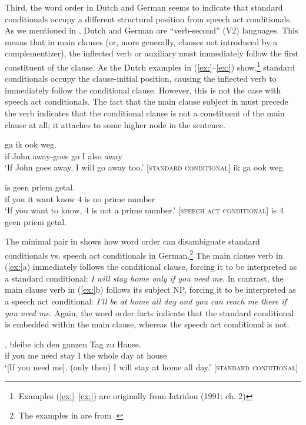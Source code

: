Third, the word order in Dutch and German seems to indicate that standard conditionals occupy a different structural position from speech act conditionals. As we mentioned in , Dutch and German are “verb-second” (V2) languages. This means that in main clauses (or, more generally, clauses not introduced by a complementizer), the inflected verb or auxiliary must immediately follow the first constituent of the clause. As the Dutch examples in (\ref{ex:}--\ref{ex:}) show,\footnote{Examples (\ref{ex:}--\ref{ex:}) are originally from Iatridou (1991: ch. 2)} standard conditionals occupy the clause-initial position, causing the inflected verb to immediately follow the conditional clause. However, this is not the case with speech act conditionals. The fact that the main clause subject in  must precede the verb indicates that the conditional clause is not a constituent of the main clause at all; it attaches to some higher node in the sentence.


\ea
\ea {}  ga  ik  ook  weg.\\
 if  John  away-goes  go  I  also  away\\
\glt ‘If John goes away, I will go away too.’    [\textsc{standard conditional}]
 ik ga ook weg.
\z \z

\ea
\ea {}  is  geen  priem  getal.\\
 if  you  it  want  know  4  is  no  prime  number\\
\glt ‘If you want to know, 4 is not a prime number.’  [\textsc{speech act} \textsc{conditional}]
 is 4 geen priem getal.
\z \z


The minimal pair in  shows how word order can disambiguate standard conditionals vs. speech act conditionals in German.\footnote{The examples in  are from \citet[102]{Scheffler2013}.} The main clause verb in (\ref{ex:}a) immediately follows the conditional clause, forcing it to be interpreted as a standard conditional: \textit{I will stay home only if you need me}. In contrast, the main clause verb in (\ref{ex:}b) follows its subject NP, forcing it to be interpreted as a speech act conditional: \textit{I’ll be at home all day and you can reach me there if you need me}. Again, the word order facts indicate that the standard conditional is embedded within the main clause, whereas the speech act conditional is not.


\ea
\ea  \gll{},  bleibe  ich  den  ganzen  Tag  zu  Hause.\\
 if  you  me  need  stay  I  the  whole  day  at  house\\
\glt ‘[If you need me], (only then) I will stay at home all day.’  [\textsc{standard conditional}]

